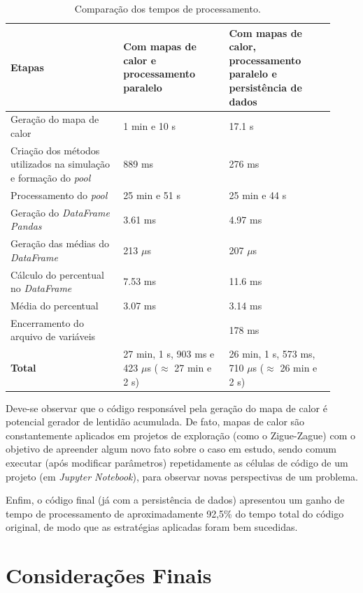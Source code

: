 \documentclass[12pt]{article}
\begin{document}
\begin{table}[ht!]
	\centering
	\caption{Comparação dos tempos de processamento.}
	\label{tab_comparacao}
	\begin{tabular}{|m{0.32\linewidth}|m{0.3\linewidth}|m{0.3\linewidth}|}
		\hline
		\textbf{Etapas} & \textbf{Com mapas de calor e processamento paralelo} &\textbf{Com mapas de calor, processamento paralelo e persistência de dados}\\
		\hline \hline
		Geração do mapa de calor & 1 min e 10 s & 17.1 s \\
		\hline
		Criação dos métodos utilizados na simulação e formação do \textit{pool} & 889 ms & 276 ms \\
		\hline
		Processamento do \textit{pool} & 25 min e 51 s & 25 min e 44 s \\
		\hline
		Geração do \textit{DataFrame Pandas} & 3.61 ms & 4.97 ms \\
		\hline
		Geração das médias do \textit{DataFrame} & 213 $\mu$s & 207 $\mu$s \\
		\hline
		Cálculo do percentual no \textit{DataFrame} & 7.53 ms & 11.6 ms \\
		\hline
		Média do percentual & 3.07 ms & 3.14 ms \\
		\hline
		Encerramento do arquivo de variáveis &  & 178 ms \\
		\hline \hline
		\textbf{Total} & 27 min, 1 s, 903 ms e 423 $\mu$s ($\approx$ 27 min e 2 s) & 26 min, 1 s, 573 ms, 710 $\mu$s ($\approx$ 26 min e 2 s) \\
		\hline
	\end{tabular}
\end{table}

Deve-se observar que o código responsável pela geração do mapa de calor é potencial gerador de lentidão acumulada. De fato, mapas de calor são constantemente aplicados em projetos de exploração (como o Zigue-Zague) com o objetivo de apreender algum novo fato sobre o caso em estudo, sendo comum executar (após modificar parâmetros) repetidamente as células de código de um projeto (em \textit{Jupyter Notebook}), para observar novas perspectivas de um problema.

Enfim, o código final (já com a persistência de dados) apresentou um ganho de tempo de processamento de aproximadamente 92,5\% do tempo total do código original, de modo que as estratégias aplicadas foram bem sucedidas.

\section{Considerações Finais}
\end{document}
